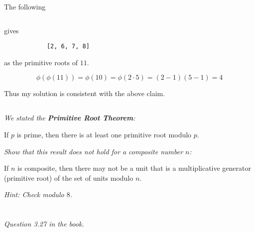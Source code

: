 \documentclass[12pt]{article}
\begin{document}
        The following
        \inputminted{python}{hw2_6.py}
        gives
        \begin{verbatim}
            [2, 6, 7, 8]
        \end{verbatim}
        as the primitive roots of $11$.

        $$\phi(\phi(11)) = \phi(10) = \phi(2 \cdot 5) = (2 - 1)(5 - 1) = 4$$

        Thus my solution is consistent with the above claim.

    \subsection{} \textit{We stated the \textbf{Primitive Root Theorem}:}

        \begin{thm}
            If $p$ is prime, then there is at least one primitive root modulo $p$.
        \end{thm}

        \textit{Show that this result does not hold for a composite number $n$:}

        \begin{thm}
            If $n$ is composite, then there may not be a unit that is a multiplicative generator (primitive root) of the set of units modulo $n$.
        \end{thm}

        \textit{Hint: Check modulo $8$.}

\section{} \textit{Question 3.27 in the book.}
\end{document}
